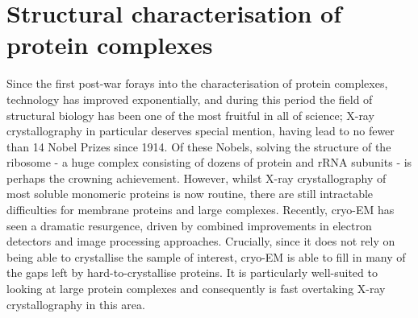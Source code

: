 \documentclass[a4paper,11pt,twoside,openright]{scrbook}
\begin{document}



\section{Structural characterisation of protein complexes}
Since the first post-war forays into the characterisation of protein complexes, technology has improved exponentially, and during this period the field of structural biology has been one of the most fruitful in all of science; X-ray crystallography in particular deserves special mention, having lead to no fewer than 14 Nobel Prizes since 1914. Of these Nobels, solving the structure of the ribosome - a huge complex consisting of dozens of protein and rRNA subunits - is perhaps the crowning achievement. However, whilst X-ray crystallography of most soluble monomeric proteins is now routine, there are still intractable difficulties for membrane proteins and large complexes. Recently, cryo-EM has seen a dramatic resurgence, driven by combined improvements in electron detectors and image processing approaches. Crucially, since it does not rely on being able to crystallise the sample of interest, cryo-EM is able to fill in many of the gaps left by hard-to-crystallise proteins. It is particularly well-suited to looking at large protein complexes and consequently is fast overtaking X-ray crystallography in this area.
\end{document}
